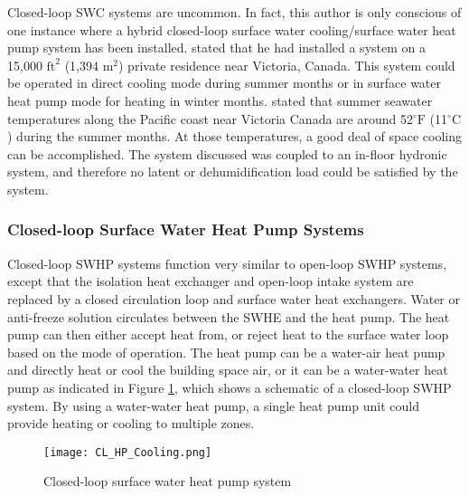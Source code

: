 Closed-loop SWC systems are uncommon. In fact, this author is only conscious of one instance where a hybrid closed-loop surface water cooling/surface water heat pump system has been installed. \cite{Lockhart2013} stated that he had installed a system on a 15,000 $\mbox{ft}^2$ (1,394 $\mbox{m}^2$) private residence near Victoria, Canada. This system could be operated in direct cooling mode during summer months or in surface water heat pump mode for heating in winter months. \cite{Lockhart2013} stated that summer seawater temperatures along the Pacific coast near Victoria Canada are around 52$^\circ \mbox{F}$ (11$^\circ \mbox{C}$) during the summer months. At those temperatures, a good deal of space cooling can be accomplished. The system discussed was coupled to an in-floor hydronic system, and therefore no latent or dehumidification load could be satisfied by the system.
	
		\subsubsection{Closed-loop Surface Water Heat Pump Systems}	
	
Closed-loop SWHP systems function very similar to open-loop SWHP systems, except that the isolation heat exchanger and open-loop intake system are replaced by a closed circulation loop and surface water heat exchangers. Water or anti-freeze solution circulates between the SWHE and the heat pump. The heat pump can then either accept heat from, or reject heat to the surface water loop based on the mode of operation. The heat pump can be a water-air heat pump and directly heat or cool the building space air, or it can be a water-water heat pump as indicated in Figure \ref{fig:Intro:SystemOverview:ClosedLoop:CLSWHPsystem}, which  shows a schematic of a closed-loop SWHP system. By using a water-water heat pump, a single heat pump unit could provide heating or cooling to multiple zones.

	\begin{figure}
		\centering
		\texttt{[image: CL\_HP\_Cooling.png]}
		\caption[Closed-loop surface water heat pump system]{Closed-loop surface water heat pump system}
		\label{fig:Intro:SystemOverview:ClosedLoop:CLSWHPsystem}
	\end{figure}	

